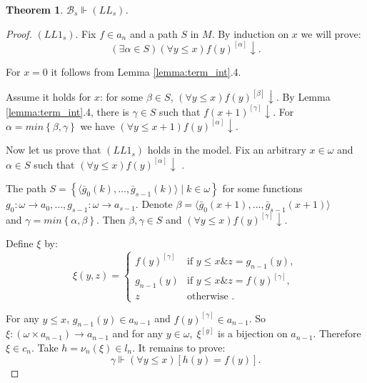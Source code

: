 \documentclass{asl}
\newtheorem{theorem}{Theorem}[section]
\theoremstyle{definition}
\begin{document}
\begin{theorem}
$\mathcal{B}_s \Vdash (LL _{s}) $.
\label{theorem:lawless}
\end{theorem}
\begin{proof}
$(LL1_s)$. Fix $f\in a_{n}$ and a path $ S $ in $ M $. By induction on $ x $ we will prove:
\[(\exists \alpha \in S)(\forall y\leqslant x)f(y)^{[\alpha]} \downarrow.\] 

For $ x=0 $ it follows from Lemma \ref{lemma:term_int}.4. 

Assume it holds for $ x $: for some $ \beta\in S $, $ (\forall y\leqslant x)f(y)^{[\beta]} \downarrow $. By Lemma \ref{lemma:term_int}.4, there is $ \gamma\in S $ such that $ f(x+1)^{[\gamma]}\downarrow $. For $ \alpha=min\left\lbrace \beta,\gamma \right\rbrace$ we have $ (\forall y\leqslant x+1)f(y)^{[\alpha]} \downarrow $.

Now let us prove that $(LL1_s)$ holds in the model. Fix an arbitrary $ x \in \omega$ and $ \alpha \in S$ such that $ (\forall y\leqslant x)f(y)^{[\alpha]} \downarrow$ . 
\smallskip

The path $ S=\left\lbrace \langle \bar{g}_0(k),\ldots,\bar{g}_{s-1}(k)\rangle \mid k\in \omega \right\rbrace$ for some functions 
\smallskip
\\$ g_0:\omega\rightarrow a_0,\ldots, g_{s-1}:\omega\rightarrow a_{s-1}$.
Denote $ \beta = \langle\bar{g}_0(x+1),\ldots, \bar{g}_{s-1}(x+1)\rangle$ 
\smallskip
\\and $\gamma=min\left\lbrace \alpha,\beta \right\rbrace$. 
Then $\beta, \gamma \in S$ and $ (\forall y\leqslant x)f(y)^{[\gamma]} \downarrow $.

Define $ \xi $ by:
\begin{displaymath}
\xi(y,z)=
\begin{cases}
f(y)^{[\gamma]} & \text{if } y\leqslant x\& z=g_{n-1}(y),\\
g_{n-1}(y) & \text{if } y\leqslant x\& z=f(y)^{[\gamma]},\\
z & \text{otherwise }.
\end{cases}
\end{displaymath} 

For any $ y\leqslant x$, $ g_{n-1}(y)\in a_{n-1} $ and $ f(y)^{[\gamma]}\in a_{n-1} $. So $ \xi:(\omega\times a_{n-1})\rightarrow a_{n-1}$ and for any $ y\in \omega,\; \xi^{[y]}$ is a bijection on $ a_{n-1} $. Therefore $ \xi\in c_{n} $. Take $h=\nu_n(\xi)\in l_{n} $. It remains to prove:
\[ \gamma\Vdash (\forall y\leqslant x)\left[ h(y)=f(y)\right].\]


\end{proof}
\end{document}
